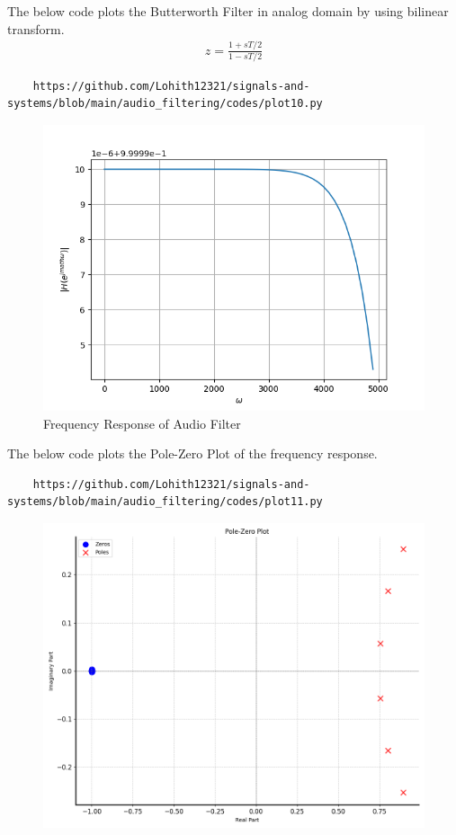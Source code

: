 \documentclass[journal,12pt,twocolumn]{IEEEtran}
\theoremstyle{remark}
\begin{document}
\begin{enumerate}[label=\thesection.\arabic*
,ref=\thesection.\theenumi]
\begin{enumerate}[label=\thesection.\arabic*
,ref=\thesection.\theenumi]
The below code plots the Butterworth Filter in analog domain by using bilinear transform.
\begin{align}
    z=\frac{1+sT/2}{1-sT/2}
\end{align}
\begin{lstlisting}
    https://github.com/Lohith12321/signals-and-systems/blob/main/audio_filtering/codes/plot10.py
\end{lstlisting}
\begin{figure}[ht]
\centering
\includegraphics[width=1\columnwidth]{figs/plot10.png}
\caption{Frequency Response of Audio Filter}
\label{fig:plot10}
\end{figure}
The below code plots the Pole-Zero Plot of the frequency response.
\begin{lstlisting}
    https://github.com/Lohith12321/signals-and-systems/blob/main/audio_filtering/codes/plot11.py
\end{lstlisting}
\begin{figure}[ht]
\centering
\includegraphics[width=1\columnwidth]{figs/plot11.png}

\end{figure}
\end{enumerate}
\end{enumerate}
\end{document}
